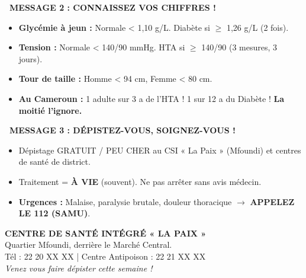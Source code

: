 \documentclass[11pt]{article}
\begin{document}
\begin{exoresolu}
\begin{center}
{\begin{minipage}{0.9\linewidth}
\textbf{\textbullet\ MESSAGE 2 : CONNAISSEZ VOS CHIFFRES !}
\begin{itemize}
    \item \textbf{Glycémie à jeun :} Normale < 1,10 g/L. Diabète si $\ge$ 1,26 g/L (2 fois).
    \item \textbf{Tension :} Normale < 140/90 mmHg. HTA si $\ge$ 140/90 (3 mesures, 3 jours).
    \item \textbf{Tour de taille :} Homme < 94 cm, Femme < 80 cm.
    \item \textbf{Au Cameroun :} 1 adulte sur 3 a de l'HTA ! 1 sur 12 a du Diabète ! \textbf{La moitié l'ignore.}
\end{itemize}

\textbf{\textbullet\ MESSAGE 3 : DÉPISTEZ-VOUS, SOIGNEZ-VOUS !}
\begin{itemize}
    \item Dépistage GRATUIT / PEU CHER au CSI « La Paix » (Mfoundi) et centres de santé de district.
    \item Traitement = \textbf{À VIE} (souvent). Ne pas arrêter sans avis médecin.
    \item \textbf{Urgences :} Malaise, paralysie brutale, douleur thoracique $\rightarrow$ \textbf{APPELEZ LE 112 (SAMU)}.
\end{itemize}

\vspace{0.5em}
\noindent\textbf{CENTRE DE SANTÉ INTÉGRÉ « LA PAIX »} \\
Quartier Mfoundi, derrière le Marché Central. \\
Tél : 22 20 XX XX \quad | \quad Centre Antipoison : 22 21 XX XX \\
\textit{Venez vous faire dépister cette semaine !}
\end{minipage}}
\end{center}

\end{exoresolu}
\end{document}
